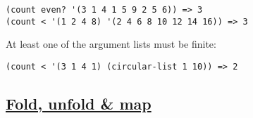 \begin{description}
\begin{verbatim}
(count even? '(3 1 4 1 5 9 2 5 6)) => 3
(count < '(1 2 4 8) '(2 4 6 8 10 12 14 16)) => 3
\end{verbatim}

At least one of the argument lists must be finite:

\begin{verbatim}
(count < '(3 1 4 1) (circular-list 1 10)) => 2
\end{verbatim}
\end{description}

\subsection{\texorpdfstring{\href{}{Fold, unfold \&
map}}{Fold, unfold \& map}}\label{fold-unfold-map}

